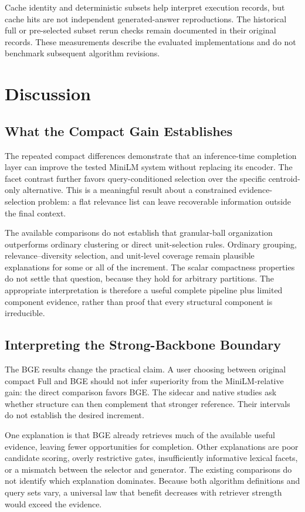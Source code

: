 \documentclass[11pt,a4paper]{article}
\begin{document}
Cache identity and deterministic subsets help interpret execution records,
but cache hits are not independent generated-answer reproductions. The
historical full or pre-selected subset rerun checks remain documented in
their original records. These measurements describe the evaluated
implementations and do not benchmark subsequent algorithm revisions.

\section{Discussion}
\subsection{What the Compact Gain Establishes}
The repeated compact differences demonstrate that an inference-time
completion layer can improve the tested MiniLM system without replacing
its encoder. The facet contrast further favors query-conditioned selection
over the specific centroid-only alternative. This is a meaningful result
about a constrained evidence-selection problem: a flat relevance list can
leave recoverable information outside the final context.

The available comparisons do not establish that granular-ball organization
outperforms ordinary clustering or direct unit-selection rules. Ordinary
grouping, relevance--diversity selection, and unit-level coverage remain
plausible explanations for some or all of the increment.
The scalar compactness properties do not settle that
question, because they hold for arbitrary partitions. The appropriate
interpretation is therefore a useful complete pipeline plus limited
component evidence, rather than proof that every structural component is
irreducible.

\subsection{Interpreting the Strong-Backbone Boundary}
The BGE results change the practical claim. A user choosing between original
compact Full and BGE should not infer superiority from the MiniLM-relative
gain: the direct comparison favors BGE. The sidecar and native studies ask
whether structure can then complement that stronger reference. Their
intervals do not establish the desired increment.

One explanation is that BGE already retrieves much of the available useful
evidence, leaving fewer opportunities for completion. Other explanations are
poor candidate scoring, overly restrictive gates, insufficiently informative
lexical facets, or a mismatch between the selector and generator.
The existing comparisons do not identify which explanation dominates.
Because both algorithm definitions and query sets vary, a universal law that
benefit decreases with retriever strength would exceed the evidence.
\end{document}
